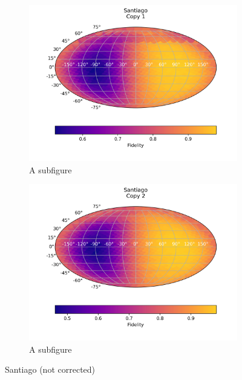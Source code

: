 \begin{figure}[H]
    \centering
    \begin{subfigure}{.5\textwidth}
      \centering
      \includegraphics[width=\textwidth]{Figures/Economical/IBM/FullSphere/results_santiago.txt_copy1.png}
      \caption{A subfigure}
      \label{fig:ec_santiago_sphere_1}
    \end{subfigure}%
    \begin{subfigure}{.5\textwidth}
      \centering
      \includegraphics[width=\textwidth]{Figures/Economical/IBM/FullSphere/results_santiago.txt_copy2.png}
      \caption{A subfigure}
      \label{fig:ec_santiago_sphere_2}
    \end{subfigure}
    \caption{Santiago (not corrected)}
    \label{fig:ec_santiago_sphere}
\end{figure}

